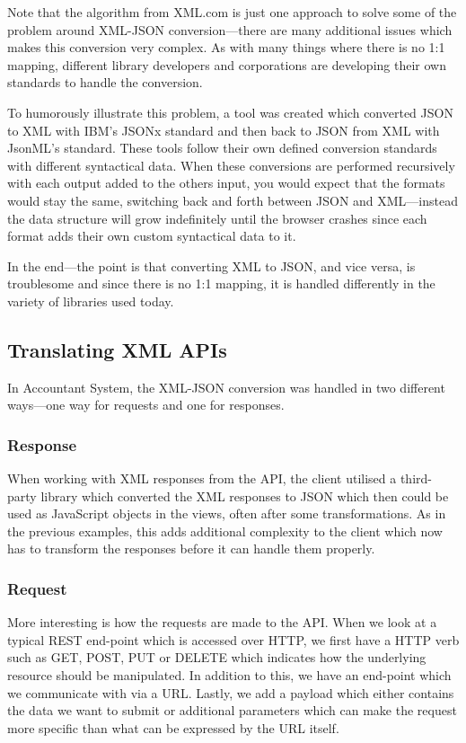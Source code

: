 \documentclass{cslthse-msc}
\begin{document}
Note that the algorithm from XML.com is just one approach to solve some of the problem around XML-JSON conversion---there are many additional issues which makes this conversion very complex. As with many things where there is no 1:1 mapping, different library developers and corporations are developing their own standards to handle the conversion.

To humorously illustrate this problem, a tool was created \cite{jsonx_jsonml} which converted JSON to XML with IBM's JSONx \cite{jsonx} standard and then back to JSON from XML with JsonML's \cite{jsonml} standard. These tools follow their own defined conversion standards with different syntactical data. When these conversions are performed recursively with each output added to the others input, you would expect that the formats would stay the same, switching back and forth between JSON and XML---instead the data structure will grow indefinitely until the browser crashes since each format adds their own custom syntactical data to it.

In the end---the point is that converting XML to JSON, and vice versa, is troublesome and since there is no 1:1 mapping, it is handled differently in the variety of libraries used today.

\subsection{Translating XML APIs}
In Accountant System, the XML-JSON conversion was handled in two different ways---one way for requests and one for responses.

\subsubsection{Response}

When working with XML responses from the API, the client utilised a third-party library which converted the XML responses to JSON which then could be used as JavaScript objects in the views, often after some transformations. As in the previous examples, this adds additional complexity to the client which now has to transform the responses before it can handle them properly.

\subsubsection{Request}
More interesting is how the requests are made to the API. When we look at a typical REST end-point which is accessed over HTTP, we first have a HTTP verb such as GET, POST, PUT or DELETE which indicates how the underlying resource should be manipulated. In addition to this, we have an end-point which we communicate with via a URL. Lastly, we add a payload which either contains the data we want to submit or additional parameters which can make the request more specific than what can be expressed by the URL itself.
\end{document}
